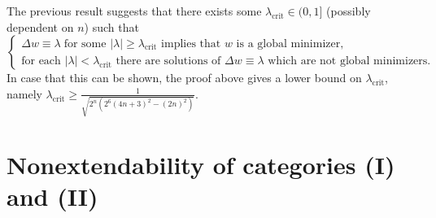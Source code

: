 \documentclass[twoside,11pt]{article}
\theoremstyle{definition}
\begin{document}
The previous result suggests that there exists some $\lambda_{\operatorname{crit}} \in (0,1]$ (possibly dependent on $n$) such that 
\begin{equation*}
\begin{cases}
\Delta w \equiv \lambda \; \textrm{for some $|\lambda| \geq \lambda_{\operatorname{crit}}$ implies that $w$ is a global minimizer,} \\ \textrm{for each $|\lambda| < \lambda_{\operatorname{crit}}$ there are solutions of $\Delta w \equiv \lambda$ which are not global minimizers.} 
\end{cases}
\end{equation*}
In case that this can be shown, the proof above gives a lower bound on $\lambda_{\operatorname{crit}}$, namely $\lambda_{\operatorname{crit}} \geq \frac{1}{\sqrt{2^n(2^6 (4n+3)^2- (2n)^2)}}$.%





\section{Nonextendability of categories (I) and (II)}\label{sec:wd1d2}
\end{document}
